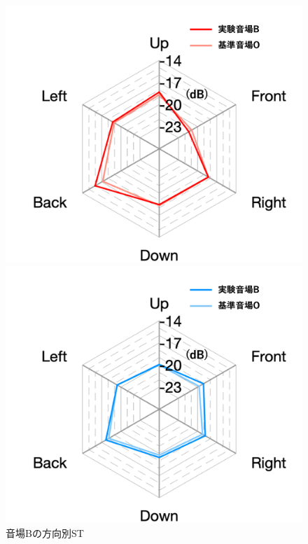 \documentclass[11pt,a4j]{jreport}
\begin{document}
  \begin{figure}[H]
    \begin{minipage}[b]{.5\linewidth}
      \centering
      \includegraphics[width=1\linewidth]{images/experimentField/withLegend/expBEarly.png}
    \end{minipage}%
    \begin{minipage}[b]{.5\linewidth}
        \centering
        \includegraphics[width=1\linewidth]{images/experimentField/withLegend/expBLate.png}
    \end{minipage}
    \caption{音場Bの方向別ST}
    \label{fig:音場Bの方向別ST}
  \end{figure}
\end{document}
